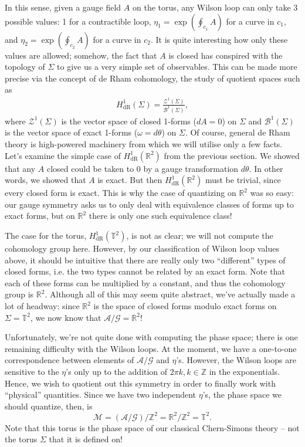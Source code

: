 \documentclass[12pt]{article}
\begin{document}
In this sense, given a gauge field $A$ on the torus, any Wilson loop can only take 3 possible values: 1 for a contractible loop, $\eta_1=\exp(\oint_{c_1} A)$ for a curve in $c_1$, and $\eta_2=\exp(\oint_{c_2} A)$ for a curve in $c_2$. It is quite interesting how only these values are allowed; somehow, the fact that $A$ is closed has conspired with the topology of $\Sigma$ to give us a very simple set of observables. This can be made more precise via the concept of de Rham cohomology, the study of quotient spaces such as
\begin{align*}
H^1_\text{dR}(\Sigma)=\frac{\mathcal{Z}^1(\Sigma)}{\mathcal{B}^1(\Sigma)},
\end{align*}
where $\mathcal{Z}^1(\Sigma)$ is the vector space of closed 1-forms ($dA=0$) on $\Sigma$ and $\mathcal{B}^1(\Sigma)$ is the vector space of exact 1-forms ($\omega=d\theta$) on $\Sigma$. Of course, general de Rham theory is high-powered machinery from which we will utilise only a few facts. Let's examine the simple case of $H^1_\text{dR}(\mathbb{R}^2)$ from the previous section. We showed that any $A$ closed could be taken to 0 by a gauge transformation $d\theta$. In other words, we showed that $A$ is exact. But then $H^1_\text{dR}(\mathbb{R}^2)$ must be trivial, since every closed form is exact. This is why the case of quantizing on $\mathbb{R}^2$ was so easy: our gauge symmetry asks us to only deal with equivalence classes of forms up to exact forms, but on $\mathbb{R}^2$ there is only one such equivalence class!

The case for the torus, $H^1_\text{dR}(\mathbb{T}^2)$, is not as clear; we will not compute the cohomology group here. However, by our classification of Wilson loop values above, it should be intuitive that there are really only two ``different'' types of closed forms, i.e. the two types cannot be related by an exact form. Note that each of these forms can be multiplied by a constant, and thus the cohomology group is $\mathbb{R}^2$. Although all of this may seem quite abstract, we've actually made a lot of headway: since $\mathbb{R}^2$ is the space of closed forms modulo exact forms on $\Sigma=\mathbb{T}^2$, we now know that $\mathcal{A}/\mathcal{G}=\mathbb{R}^2$!

Unfortunately, we're not quite done with computing the phase space; there is one remaining difficulty with the Wilson loops. 
At the moment, we have a one-to-one correspondence between elements of $\mathcal{A}/\mathcal{G}$ and $\eta$'s. However, the Wilson loops are sensitive to the $\eta$'s only up to the addition of $2\pi k,k\in\mathbb{Z}$ in the exponentials. Hence, we wish to quotient out this symmetry in order to finally work with ``physical'' quantities. Since we have two independent $\eta$'s, the phase space we should quantize, then, is \[\mathcal{M}=\left(\mathcal{A}/\mathcal{G}\right)/\mathbb{Z}^2=\mathbb{R}^2/\mathbb{Z}^2=\mathbb{T}^2.\]
Note that this torus is the phase space of our classical Chern-Simons theory -- not the torus $\Sigma$ that it is defined on!
\end{document}
